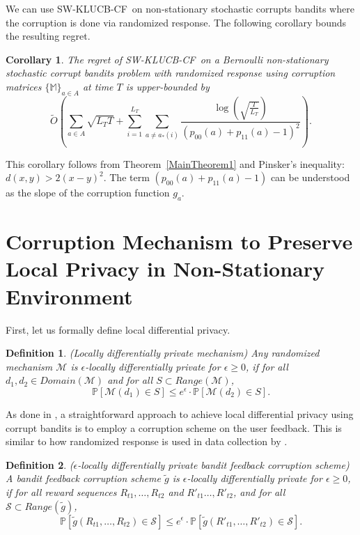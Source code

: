 \documentclass[letterpaper]{article} %
\newcommand{\bP}{\mathds{P}}
\newcommand{\SWKLUCBCF}{\textsc{SW-KLUCB-CF}}
\newcommand{\optArmAtIChanges}[1]{a_{*}(#1)}
\newcommand{\numChanges}{L}
\newcounter{counterCorollary}
\newtheorem{myCorollary}[counterCorollary]{Corollary}
\newtheorem{myDefinition}{Definition}
\begin{document}
We can use \SWKLUCBCF \ on non-stationary stochastic corrupts bandits where the corruption is done via randomized response. The following corollary bounds the resulting regret.
\begin{myCorollary}
\label{UB_corollary}
The regret of \SWKLUCBCF \ on a Bernoulli non-stationary stochastic corrupt bandits problem with randomized response using corruption matrices $\{\mathds{M}\}_{a \in A}$ at time $T$ is upper-bounded by
$$
\tilde{O}\left( \sum_{a \in A} \sqrt{\numChanges_T T} + \sum_{i=1}^{\numChanges_T} \sum_{a \neq \optArmAtIChanges{i}} \frac{\log{\left(  \sqrt{ \frac{T}{\numChanges_T}} \right)}}{(p_{00}(a) + p_{11}(a)-1)^2} \right).
$$
\end{myCorollary}
\noindent
This corollary follows from Theorem~\ref{MainTheorem1} and Pinsker's inequality: $d(x,y) > 2(x-y)^2$.
The term $(p_{00}(a) + p_{11}(a) -1)$ can be understood as the slope of the corruption function $g_a$.

\section{Corruption Mechanism to Preserve Local Privacy in Non-Stationary Environment}
\label{sec:privacy}
First, let us formally define local differential privacy.
\begin{myDefinition}
\label{def:diff_privacy}
(Locally differentially private mechanism) Any randomized mechanism $\mathcal{M}$ is $\epsilon$-locally differentially private for $\epsilon \geq 0$, if for all  $d_1, d_2 \in Domain(\mathcal{M})$ and for all $S \subset Range(\mathcal{M})$,
$$
\bP[\mathcal{M}(d_1) \in S] \leq e^\epsilon \cdot \bP [\mathcal{M}(d_2) \in S].
$$
\end{myDefinition}
%
As done in \citet{pmlr-v83-gajane18a}, a straightforward approach to achieve local differential privacy using corrupt bandits is to employ a corruption scheme on the user feedback.
This is similar to how randomized response is used in data collection by \citet{DBLP:conf/edbt/0009WH16}.    

\begin{myDefinition}
($\epsilon$-locally differentially private bandit feedback corruption scheme) A bandit feedback corruption scheme $\tilde{g}$ is $\epsilon$-locally differentially private for $\epsilon \geq 0$, if for all reward sequences $R_{t1}, \dots, R_{t2}$ and $R'_{t1} \dots, R'_{t2}$, and for all $\mathcal{S} \subset Range(\tilde{g})$, 
\begin{equation*} 
\bP [\tilde{g}(R_{t1}, \dots, R_{t2}) \in \mathcal{S} ] \leq e^\epsilon \cdot \bP [\tilde{g}(R'_{t1}, \dots, R'_{t2}) \in \mathcal{S} ].
\end{equation*}
\end{myDefinition}
\end{document}
